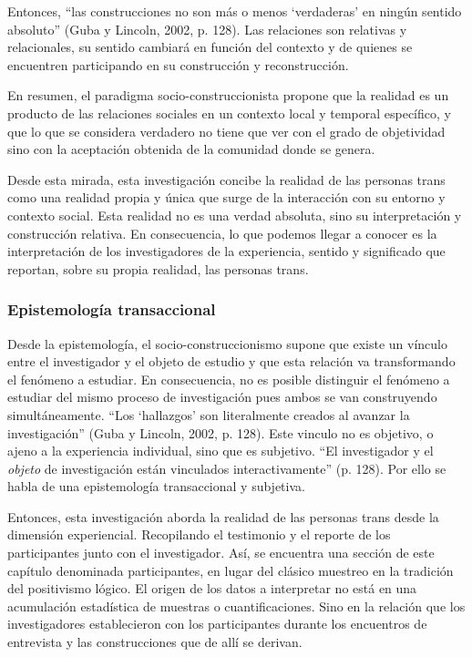 Entonces, “las construcciones no son más o menos ‘verdaderas’ en ningún sentido
absoluto” (Guba y Lincoln, 2002, p. 128).
Las relaciones son relativas y relacionales, su sentido cambiará en función del
contexto y de quienes se encuentren participando en su construcción y
reconstrucción.

En resumen, el paradigma socio-construccionista propone que la realidad es un
producto de las relaciones sociales en un contexto local y temporal específico,
y que lo que se considera verdadero no tiene que ver con el grado de objetividad
sino con la aceptación obtenida de la comunidad donde se genera.

Desde esta mirada, esta investigación concibe la realidad de las personas trans
como una realidad propia y única que surge de la interacción con su entorno y
contexto social.
Esta realidad no es una verdad absoluta, sino su interpretación y construcción
relativa.
En consecuencia, lo que podemos llegar a conocer es la interpretación de los
investigadores de la experiencia, sentido y significado que reportan, sobre su
propia realidad, las personas trans.

\subsubsection{Epistemología transaccional}
Desde la epistemología, el socio-construccionismo supone que existe un vínculo
entre el investigador y el objeto de estudio y que esta relación va
transformando el fenómeno a estudiar.
En consecuencia, no es posible distinguir el fenómeno a estudiar del mismo
proceso de investigación pues ambos se van construyendo simultáneamente.
“Los ‘hallazgos’ son literalmente creados al avanzar la investigación” (Guba y
Lincoln, 2002, p. 128).
Este vinculo no es objetivo, o ajeno a la experiencia individual, sino que es
subjetivo.
“El investigador y el \emph{objeto} de investigación están vinculados
interactivamente”
(p. 128).
Por ello se habla de una epistemología transaccional y subjetiva.

Entonces, esta investigación aborda la realidad de las personas trans desde la
dimensión experiencial.
Recopilando el testimonio y el reporte de los participantes junto con el
investigador.
Así, se encuentra una sección de este capítulo denominada participantes, en
lugar del clásico muestreo en la tradición del positivismo lógico.
El origen de los datos a interpretar no está en una acumulación estadística de
muestras o cuantificaciones.
Sino en la relación que los investigadores establecieron con los participantes
durante los encuentros de entrevista y las construcciones que de allí se
derivan.

